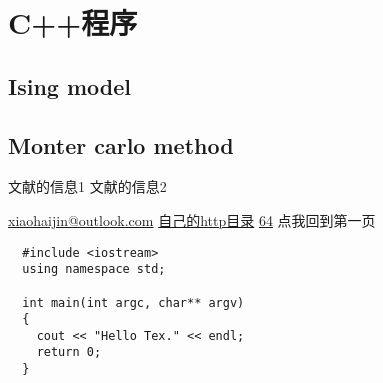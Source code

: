 \documentclass[11pt,UTF8,hyperref,openany]{ctexbook}
\begin{document}
\appendix
\chapter{C++程序}
\section{Ising model}
\section{Monter carlo method}

\begin{thebibliography}{99}
文献的信息1
文献的信息2
\end{thebibliography}

\noindent\url{xiaohaijin@outlook.com}\newline
\href{http://192.168.1.119/self/index.html}{自己的http目录}\newline
\href{http://10.10.11.64}{64}\newline
点我回到第一页

\begin{linenumbers}[2]%
  \newline
\end{linenumbers}

\begin{lstlisting}
  #include <iostream>
  using namespace std;

  int main(int argc, char** argv)
  {
    cout << "Hello Tex." << endl;
    return 0;
  }
\end{lstlisting}
\end{document}
